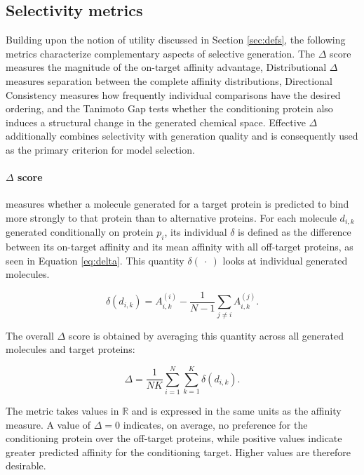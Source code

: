 \documentclass[a4paper,12pt]{article}
\begin{document}
\subsection{Selectivity metrics}
Building upon the notion of utility discussed in Section \ref{sec:defs}, the following metrics characterize complementary aspects of selective generation. The $\Delta$ score measures the magnitude of the on-target affinity advantage, Distributional $\Delta$ measures separation between the complete affinity distributions, Directional Consistency measures how frequently individual comparisons have the desired ordering, and the Tanimoto Gap tests whether the conditioning protein also induces a structural change in the generated chemical space. Effective $\Delta$ additionally combines selectivity with generation quality and is consequently used as the primary criterion for model selection.

\paragraph{$\Delta$ score {\normalfont\parencite{Gao_Ren_Ni_2024}}}
measures whether a molecule generated for a target protein is predicted to bind more strongly to that protein than to alternative proteins. For each molecule $d_{i,k}$ generated conditionally on protein $p_i$, its individual $\delta$ is defined as the difference between its on-target affinity and its mean affinity with all off-target proteins, as seen in Equation \ref{eq:delta}. This quantity $\delta(\ \cdot\ )$ looks at individual generated molecules.

\begin{equation}\label{eq:delta}
    \delta(d_{i,k})
    =
    A_{i,k}^{(i)}
    -
    \frac{1}{N-1}
    \sum_{j\neq i}
    A_{i,k}^{(j)}.
\end{equation}

The overall $\Delta$ score is obtained by averaging this quantity across all generated molecules and target proteins:

\begin{equation*}
    \Delta
    =
    \frac{1}{NK}
    \sum_{i=1}^{N}
    \sum_{k=1}^{K}
    \delta(d_{i,k}).
\end{equation*}

The metric takes values in $\mathbb{R}$ and is expressed in the same units as the affinity measure. A value of $\Delta=0$ indicates, on average, no preference for the conditioning protein over the off-target proteins, while positive values indicate greater predicted affinity for the conditioning target. Higher values are therefore desirable.
\end{document}
